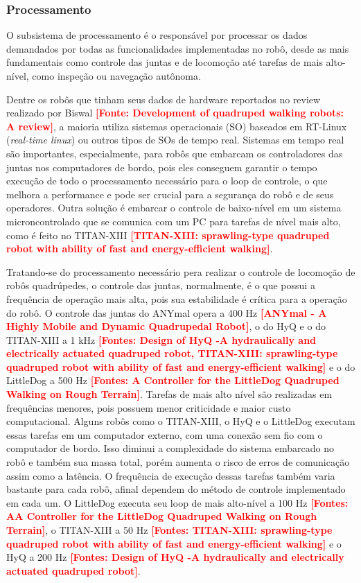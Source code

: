\documentclass[../main.tex]{subfiles}
\begin{document}
  \subsubsection{Processamento}
  O subsistema de processamento é o responsável por processar os dados demandados por todas as funcionalidades implementadas no robô, desde as mais fundamentais como controle das juntas e de locomoção até tarefas de mais alto-nível, como inspeção ou navegação autônoma.

  Dentre os robôs que tinham seus dados de hardware reportados no review realizado por Biswal \textbf{\textcolor{red}{[Fonte: Development of quadruped walking robots: A review]}}, a maioria utiliza sistemas operacionais (SO) baseados em RT-Linux (\textit{real-time linux}) ou outros tipos de SOs de tempo real. Sistemas em tempo real são importantes, especialmente, para robôs que embarcam os controladores das juntas nos computadores de bordo, pois eles conseguem garantir o tempo execução de todo o processamento necessário para o loop de controle, o que melhora a performance e pode ser crucial para a segurança do robô e de seus operadores. Outra solução é embarcar o controle de baixo-nível em um sistema microncontrolado que se comunica com um PC para tarefas de nível mais alto, como é feito no TITAN-XIII \textbf{\textcolor{red}{[TITAN-XIII: sprawling-type quadruped robot with ability of fast and energy-efficient walking]}}.

  Tratando-se do processamento necessário pera realizar o controle de locomoção de robôs quadrúpedes, o controle das juntas, normalmente, é o que possui a frequência de operação mais alta, pois sua estabilidade é crítica para a operação do robô. O controle das juntas do ANYmal opera a 400 Hz \textbf{\textcolor{red}{[ANYmal - A Highly Mobile and Dynamic Quadrupedal Robot]}}, o do HyQ e o do TITAN-XIII a 1 kHz \textbf{\textcolor{red}{[Fontes: Design of HyQ -A hydraulically and electrically actuated quadruped robot, TITAN-XIII: sprawling-type quadruped robot with ability of fast and energy-efficient walking]}} e o do LittleDog a 500 Hz \textbf{\textcolor{red}{[Fontes: A Controller for the LittleDog Quadruped Walking on Rough Terrain]}}. Tarefas de mais alto nível são realizadas em frequências menores, pois possuem menor criticidade e maior custo computacional. Alguns robôs como o TITAN-XIII, o HyQ e o LittleDog executam essas tarefas em um computador externo, com uma conexão sem fio com o computador de bordo. Isso diminui a complexidade do sistema embarcado no robô e também sua massa total, porém aumenta o risco de erros de comunicação assim como a latência. O frequência de execução dessas tarefas também varia bastante para cada robô, afinal dependem do método de controle implementado em cada um. O LittleDog executa seu loop de mais alto-nível a 100 Hz \textbf{\textcolor{red}{[Fontes: AA Controller for the LittleDog Quadruped Walking on Rough Terrain]}}, o TITAN-XIII a 50 Hz \textbf{\textcolor{red}{[Fontes: TITAN-XIII: sprawling-type quadruped robot with ability of fast and energy-efficient walking]}} e o HyQ a 200 Hz \textbf{\textcolor{red}{[Fontes: Design of HyQ -A hydraulically and electrically actuated quadruped robot]}}.
\end{document}
